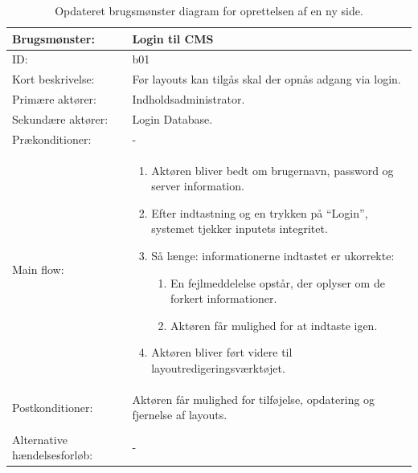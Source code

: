 \begin{table}[H]
    \begin{tabular}{|p{5cm}|p{10cm}|}
        \hline
        Brugsmønster: & Login til CMS \\ 
        \hline
        ID: & b01 \\ 
        \hline
        Kort beskrivelse: & Før layouts kan tilgås skal der opnås adgang via login. \\ 
        \hline
        Primære aktører: & Indholdsadministrator. \\ 
        \hline
        Sekundære aktører: & Login Database. \\ 
        \hline
        Prækonditioner: & - \\ 
        \hline
        Main flow: &    
        \begin{minipage}{10cm}
                \begin{enumerate}
                    \item Aktøren bliver bedt om brugernavn, password og server information.
                    \item Efter indtastning og en trykken på “Login”, systemet tjekker inputets integritet.
                    \item Så længe: informationerne indtastet er ukorrekte:
                    	\begin{enumerate}
                    	\item En fejlmeddelelse opstår, der oplyser om de forkert informationer.
                       	\item Aktøren får mulighed for at indtaste igen.
                    	\end{enumerate}
                    \item Aktøren bliver ført videre til layoutredigeringsværktøjet.
        \end{enumerate}
        \end{minipage} \par \\

        \hline
        Postkonditioner: & 
                     Aktøren får mulighed for tilføjelse, opdatering og fjernelse af layouts. \par \\ \\ 
        \hline
        Alternative hændelsesforløb: & - \\ 
        \hline
    \end{tabular}
    \caption{Opdateret brugsmønster diagram for oprettelsen af en ny side.}
    \label{Elab:UC-Login}
\end{table}





